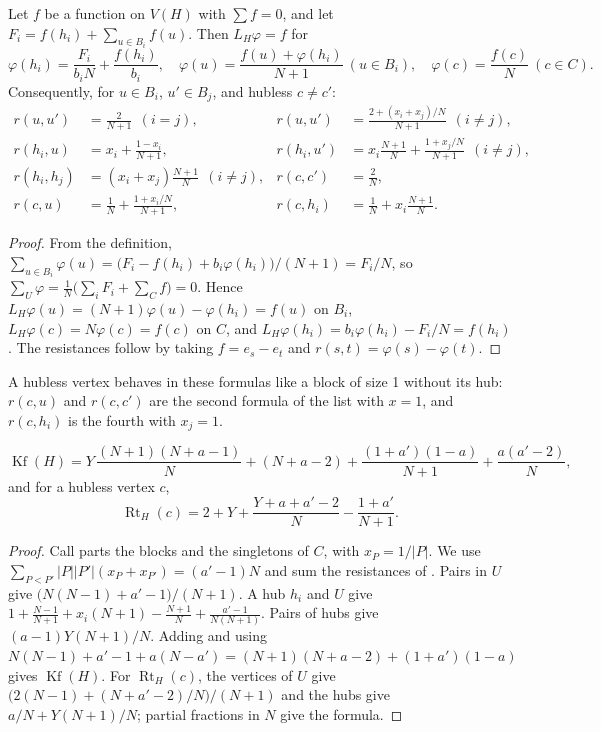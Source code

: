 \documentclass[11pt,a4paper]{report}
\newcommand*{\Kf}{\operatorname{Kf}}
\newcommand*{\Rt}{\operatorname{Rt}}
\begin{document}
\begin{lemma}\label{lem:res}
Let \(f\) be a function on \(V(H)\) with \(\sum f=0\), and let \(F_i=f(h_i)+\sum_{u\in B_i}f(u)\). Then \(L_H\varphi=f\) for
\[\varphi(h_i)=\frac{F_i}{b_iN}+\frac{f(h_i)}{b_i},\quad\varphi(u)=\frac{f(u)+\varphi(h_i)}{N+1}\ (u\in B_i),\quad
\varphi(c)=\frac{f(c)}N\ (c\in C).\]
Consequently, for \(u\in B_i\), \(u'\in B_j\), and hubless \(c\neq c'\):
\begin{align*}
r(u,u')&=\frac2{N+1}\ \ (i=j),&r(u,u')&=\frac{2+(x_i+x_j)/N}{N+1}\ \ (i\ne j),\\
r(h_i,u)&=x_i+\frac{1-x_i}{N+1},&r(h_i,u')&=x_i\frac{N+1}N+\frac{1+x_j/N}{N+1}\ \ (i\ne j),\\
r(h_i,h_j)&=(x_i+x_j)\frac{N+1}N\ \ (i\neq j),&r(c,c')&=\frac2N,\\
r(c,u)&=\frac1N+\frac{1+x_i/N}{N+1},&r(c,h_i)&=\frac1N+x_i\frac{N+1}N.
\end{align*}
\end{lemma}
\begin{proof}
From the definition, \(\sum_{u\in B_i}\varphi(u)=\bigl(F_i-f(h_i)+b_i\varphi(h_i)\bigr)/(N+1)=F_i/N\), so
\(\sum_U\varphi=\frac1N\bigl(\sum_iF_i+\sum_Cf\bigr)=0\). Hence \(L_H\varphi(u)=(N+1)\varphi(u)-\varphi(h_i)=f(u)\) on \(B_i\),
\(L_H\varphi(c)=N\varphi(c)=f(c)\) on \(C\), and \(L_H\varphi(h_i)=b_i\varphi(h_i)-F_i/N=f(h_i)\). The resistances follow by
taking \(f=e_s-e_t\) and \(r(s,t)=\varphi(s)-\varphi(t)\).
\end{proof}

A hubless vertex behaves in these formulas like a block of size 1 without its hub: \(r(c,u)\) and \(r(c,c')\) are the second
formula of the list with \(x=1\), and \(r(c,h_i)\) is the fourth with \(x_j=1\).

\begin{lemma}\label{lem:kf}
\[\Kf(H)=Y\,\frac{(N+1)(N+a-1)}N+(N+a-2)+\frac{(1+a')(1-a)}{N+1}+\frac{a(a'-2)}N,\]
and for a hubless vertex \(c\),
\[\Rt_H(c)=2+Y+\frac{Y+a+a'-2}N-\frac{1+a'}{N+1}.\]
\end{lemma}
\begin{proof}
Call parts the blocks and the singletons of \(C\), with \(x_P=1/|P|\). We use \(\sum_{P<P'}|P||P'|(x_P+x_{P'})=(a'-1)N\) and
sum the resistances of . Pairs in \(U\) give \(\bigl(N(N-1)+a'-1\bigr)/(N+1)\). A hub \(h_i\) and \(U\) give
\(1+\frac{N-1}{N+1}+x_i(N+1)-\frac{N+1}N+\frac{a'-1}{N(N+1)}\). Pairs of hubs give \((a-1)Y(N+1)/N\). Adding and using
\(N(N-1)+a'-1+a(N-a')=(N+1)(N+a-2)+(1+a')(1-a)\) gives \(\Kf(H)\). For \(\Rt_H(c)\), the vertices of \(U\) give
\(\bigl(2(N-1)+(N+a'-2)/N\bigr)/(N+1)\) and the hubs give \(a/N+Y(N+1)/N\); partial fractions in \(N\) give the formula.
\end{proof}
\end{document}
